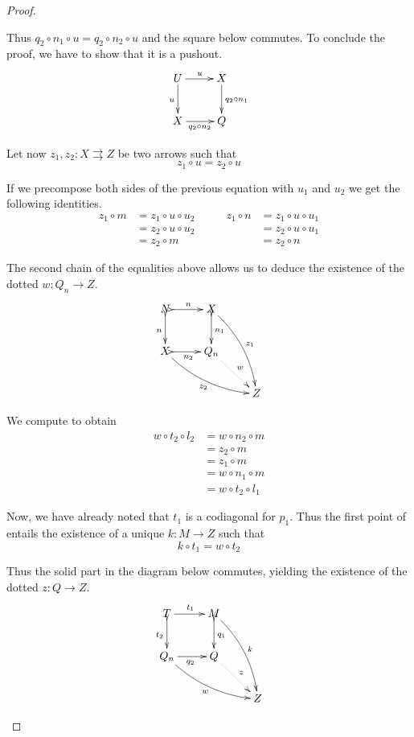 \documentclass[a4paper]{article}
\theoremstyle{definition}
\begin{document}
\begin{proof}
\begin{enumerate}
		Thus $q_2\circ n_1\circ u = q_2\circ n_2\circ u$ and the square below commutes. To conclude the proof, we have to show that it is a pushout.
		\[\xymatrix{U \ar[r]^u \ar[d]_u & X \ar[d]^{q_2\circ n_1}\\  X\ar[r]_{q_2\circ n_2} &  Q }\]
		
		Let now $z_1, z_2\colon X\rightrightarrows Z$ be two arrows such that 
		\[z_1\circ u=z_2\circ u\]
		
		If we precompose both sides of the previous equation  with $u_1$ and $u_2$ we get the following identities.
		\[\begin{split}
			z_1\circ m &= z_1\circ u\circ u_2\\&=z_2\circ u \circ u_2\\&=z_2\circ m
		\end{split} \qquad \begin{split}
			z_1\circ n &= z_1\circ u\circ u_1\\&=z_2\circ u \circ u_1\\&=z_2\circ n
		\end{split}\]
			
		The second chain of the equalities above allows us to deduce the existence of the dotted $w\colon Q_n\to Z$.
		\[\xymatrix{N \ar@{>->}[r]^{n} \ar@{>->}[d]_{n} & X\ar@{>->}[d]^{n_1} \ar@/^.3cm/[ddr]^{z_1} \\ X \ar@/_.3cm/[drr]_{z_2}\ar@{>->}[r]_{n_2} & Q_n \ar@{.>}[dr]^{w} \\ && Z}\]
		
		We compute to obtain
		\begin{align*}w\circ t_2\circ l_2&=w\circ n_2\circ m\\&=z_2\circ m\\&=z_1\circ m\\&=w\circ n_1\circ m\\&=w\circ t_2\circ l_1
		\end{align*}
		
	Now, we have already noted that $t_1$ is a codiagonal for $p_1$. Thus the first point of   entails the existence of a unique $k\colon M\to Z$ such that 
	\[k\circ t_1=w\circ t_2\]
	
	Thus the solid part in the diagram below commutes, yielding the existence of the dotted $z\colon Q\to Z$.
		\[\xymatrix{T \ar[r]^{t_1} \ar@{>->}[d]_{t_2}& M \ar@/^.3cm/[ddr]^{k}\ar@{>->}[d]^{q_1}\\ Q_n \ar@/_.3cm/[drr]_{w}\ar[r]_{q_2} & Q \ar@{.>}[dr]^{z}\\ && Z }\]


\end{enumerate}
\end{proof}
\end{document}
